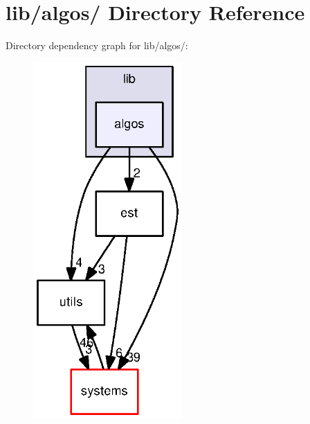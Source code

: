 \section{lib/algos/ \-Directory \-Reference}
\label{dir_d7f365b2b2b30b8fc51c9dd2bba94deb}
\-Directory dependency graph for lib/algos/\-:
\nopagebreak
\begin{figure}[H]
\begin{center}
\leavevmode
\includegraphics[width=161pt]{dir_d7f365b2b2b30b8fc51c9dd2bba94deb_dep}
\end{center}
\end{figure}
